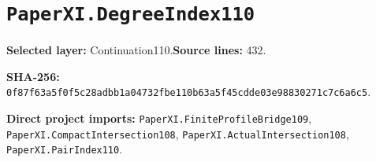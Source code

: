 \documentclass[10pt,oneside]{book}
\begin{document}
\section{\texorpdfstring{\nolinkurl{PaperXI.DegreeIndex110}}{PaperXI.DegreeIndex110}}\label{module:PaperXI.DegreeIndex110}

\textbf{Selected layer:} Continuation110.\quad\textbf{Source lines:} 432.\par\textbf{SHA-256:} {\scriptsize\nolinkurl{0f87f63a5f0f5c28adbb1a04732fbe110b63a5f45cdde03e98830271c7c6a6c5}}.


\textbf{Direct project imports:} \nolinkurl{PaperXI.FiniteProfileBridge109}, \nolinkurl{PaperXI.CompactIntersection108}, \nolinkurl{PaperXI.ActualIntersection108}, \nolinkurl{PaperXI.PairIndex110}.
\end{document}
